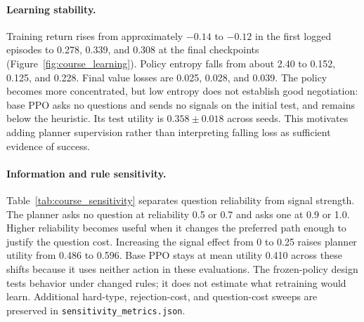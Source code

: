 \paragraph{Learning stability.}
Training return rises from approximately $-0.14$ to $-0.12$ in the first logged episodes to 0.278, 0.339, and 0.308 at the final checkpoints (Figure~\ref{fig:course_learning}). Policy entropy falls from about 2.40 to 0.152, 0.125, and 0.228. Final value losses are 0.025, 0.028, and 0.039. The policy becomes more concentrated, but low entropy does not establish good negotiation: base PPO asks no questions and sends no signals on the initial test, and remains below the heuristic. Its test utility is $0.358\pm0.018$ across seeds. This motivates adding planner supervision rather than interpreting falling loss as sufficient evidence of success.

\begin{table}[t]
\centering\small

\caption{One-factor evaluation-only rule shifts. Planner and PPO columns report utility; Questions is the planner's expected question count. PPO averages three frozen seeds. Other parameters are fixed to the reference configuration.}
\label{tab:course_sensitivity}
\end{table}

\paragraph{Information and rule sensitivity.}
Table~\ref{tab:course_sensitivity} separates question reliability from signal strength. The planner asks no question at reliability 0.5 or 0.7 and asks one at 0.9 or 1.0. Higher reliability becomes useful when it changes the preferred path enough to justify the question cost. Increasing the signal effect from 0 to 0.25 raises planner utility from 0.486 to 0.596. Base PPO stays at mean utility 0.410 across these shifts because it uses neither action in these evaluations. The frozen-policy design tests behavior under changed rules; it does not estimate what retraining would learn. Additional hard-type, rejection-cost, and question-cost sweeps are preserved in \texttt{sensitivity\_metrics.json}.

\begin{table}[t]
\centering\small
\setlength{\tabcolsep}{3.5pt}

\caption{Additional initial-test metrics, averaged with the same event-group weighting as Table~\ref{tab:policies}A. Own and Other are pre-cost utilities averaged over all outcomes. Break is the breakdown rate, Reverse counts commitment reversals, and Viol. counts bilateral-acceptance violations. Escalation $e$ is a designed rejection index.}
\label{tab:course_metrics}
\end{table}

